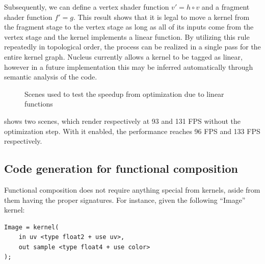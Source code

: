 Subsequently, we can define a vertex shader function $v\prime = h \circ v$ and a fragment shader function $f\prime = g$. This result shows that it is legal to move a kernel from the fragment stage to the vertex stage as long as all of its inputs come from the vertex stage and the kernel implements a linear function. By utilizing this rule repeatedly in topological order, the process can be realized in a single pass for the entire kernel graph. Nucleus currently allows a kernel to be tagged as linear, however in a future implementation this may be inferred automatically through semantic analysis of the code.

\begin{figure}[ht!]
  \centering
  \caption{Scenes used to test the speedup from optimization due to linear functions}
  \label{fig:linFuncOpt}
\end{figure}

 shows two scenes, which render respectively at 93 and 131 FPS without the optimization step. With it enabled, the performance reaches 96 FPS and 133 FPS respectively.

\subsection{Code generation for functional composition}

Functional composition does not require anything special from kernels, aside from them having the proper signatures. For instance, given the following ``Image'' kernel:

\noindent\begin{minipage}{\textwidth}
\begin{lstlisting}[frame=single]
Image = kernel(
    in uv <type float2 + use uv>,
    out sample <type float4 + use color>
);
\end{lstlisting}
\end{minipage}

